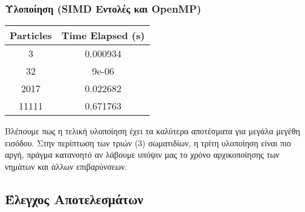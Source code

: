 \documentclass[11pt]{scrartcl} %
\begin{document}
\subsubsection{ Υλοποίηση (SIMD Εντολές και OpenMP)}

\begin{table}[!ht]
    \centering
    \begin{tabular}{|c|c|}
    \hline
        \textbf{Particles} & \textbf{Time Elapsed (s)} \\ \hline
            3     & 0.000934 \\ \hline
            32    & 9e-06    \\ \hline
            2017  & 0.022682 \\ \hline
            11111 & 0.671763 \\ \hline
    \end{tabular}
\end{table}

Βλέπουμε πως η τελική υλοποίηση έχει τα καλύτερα αποτέσματα για μεγάλα μεγέθη εισόδου.
Στην περίπτωση των τριών (3) σωματιδίων, η τρίτη υλοποίηση είναι πιο αργή, πράγμα κατανοητό αν λάβουμε υπόψιν μας το χρόνο αρχικοποίησης των νημάτων και άλλων επιβαρύνσεων.

\subsection{Έλεγχος Αποτελεσμάτων}


\end{document}
